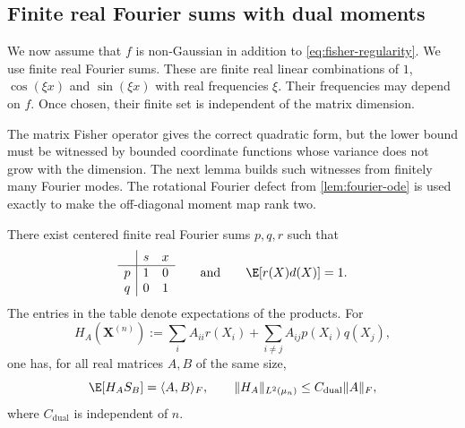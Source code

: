 \subsection{Finite real Fourier sums with dual moments}
\label{sec:fourier-dual-moments}

We now assume that $f$ is non-Gaussian in addition to
\eqref{eq:fisher-regularity}.
We use finite real Fourier sums.
These are finite real linear combinations of $1$, $\cos(\xi x)$ and
$\sin(\xi x)$ with real frequencies $\xi$.
Their frequencies may depend on $f$.
Once chosen, their finite set is independent of the matrix dimension.

The matrix Fisher operator gives the correct quadratic form, but the lower bound
must be witnessed by bounded coordinate functions whose variance does not
grow with the dimension.
The next lemma builds such witnesses from finitely many Fourier modes.
The rotational Fourier defect from \cref{lem:fourier-ode} is used exactly
to make the off-diagonal moment map rank two.

\begin{lemma}
\label{lem:fourier-dual-moments}
There exist centered finite real Fourier sums $p,q,r$ such that
\begin{equation}
 \begin{array}{c|cc}
       &s&x\\ \hline
 p     &1&0\\
 q     &0&1
 \end{array}
 \qquad\text{and}\qquad \E[r(X)d(X)]=1.
 \label{eq:fourier-dual-moments}
\end{equation}
The entries in the table denote expectations of the products.
For
\begin{equation}
 H_A(\mathbf X^{(n)}):=\sum_i A_{ii}r(X_i)
              +\sum_{i\ne j}A_{ij}p(X_i)q(X_j),
 \label{eq:fourier-functions}
\end{equation}
one has, for all real matrices $A,B$ of the same size,
\begin{equation}
 \E[H_AS_B]=\langle A,B\rangle_F,
 \qquad \|H_A\|_{L^2(\mu_n)}\le C_{\mathrm{dual}}\|A\|_F,
 \label{eq:matched-fourier-pairing}
\end{equation}
where $C_{\mathrm{dual}}$ is independent of $n$.
\end{lemma}

